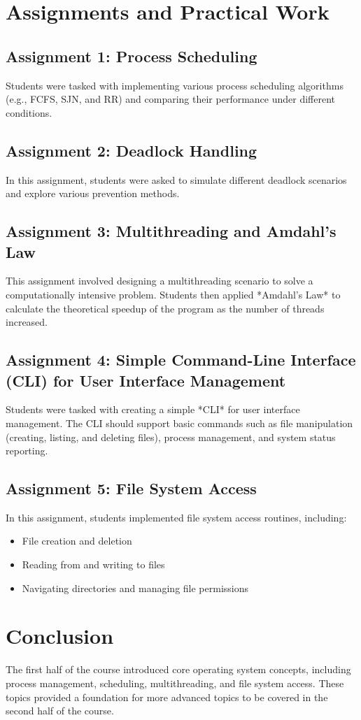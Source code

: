\documentclass[12pt]{article}
\begin{document}
	\section{Assignments and Practical Work}
	\subsection{Assignment 1: Process Scheduling}
	Students were tasked with implementing various process scheduling algorithms (e.g., FCFS, SJN, and RR) and comparing their performance under different conditions.
	
	\subsection{Assignment 2: Deadlock Handling}
	In this assignment, students were asked to simulate different deadlock scenarios and explore various prevention methods.
	
	\subsection{Assignment 3: Multithreading and Amdahl's Law}
	This assignment involved designing a multithreading scenario to solve a computationally intensive problem. Students then applied *Amdahl's Law* to calculate the theoretical speedup of the program as the number of threads increased.
	
	\subsection{Assignment 4: Simple Command-Line Interface (CLI) for User Interface Management}
	Students were tasked with creating a simple *CLI* for user interface management. The CLI should support basic commands such as file manipulation (creating, listing, and deleting files), process management, and system status reporting.
	
	\subsection{Assignment 5: File System Access}
	In this assignment, students implemented file system access routines, including:
	\begin{itemize}
		\item File creation and deletion
		\item Reading from and writing to files
		\item Navigating directories and managing file permissions
	\end{itemize}
	
	\section{Conclusion}
	The first half of the course introduced core operating system concepts, including process management, scheduling, multithreading, and file system access. These topics provided a foundation for more advanced topics to be covered in the second half of the course.
	
\end{document}
